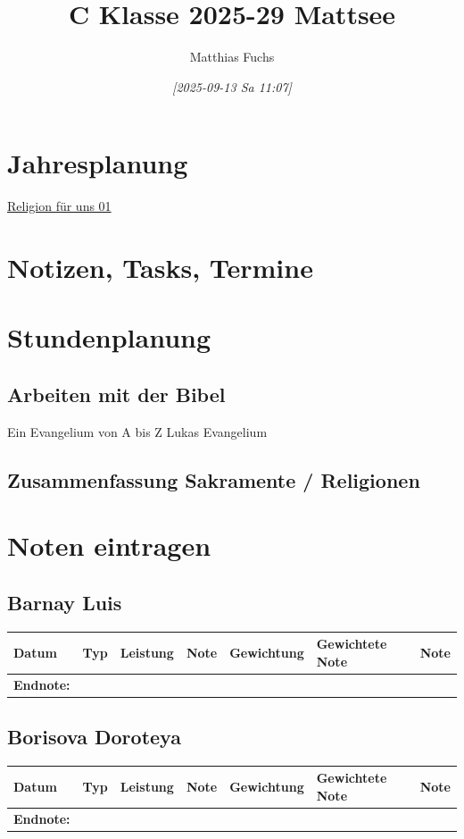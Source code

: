 \documentclass[11pt]{article}
\author{Matthias Fuchs}
\date{\textit{{[}2025-09-13 Sa 11:07]}}
\title{C Klasse 2025-29 Mattsee}
\begin{document}
\maketitle
\tableofcontents

\section{Jahresplanung}
\label{sec:orgd0d6fd6}

\href{/home/matthias/Documents/notes/20250913T113018--religion-für-uns-01\_\_project\_topic01.org}{Religion für uns 01}
\section{Notizen, Tasks, Termine}
\label{sec:orgbe9558c}


\section{Stundenplanung}
\label{sec:org8c852da}

\subsection{Arbeiten mit der Bibel}
\label{sec:org263f7cb}

Ein Evangelium von A bis Z
Lukas Evangelium
\subsection{Zusammenfassung Sakramente / Religionen}
\label{sec:orgdd80448}
\section{Noten eintragen}
\label{sec:org3b29bf7}

\subsection{Barnay Luis}
\label{sec:org83da576}
\begin{center}
\begin{tabular}{lllllll}
Datum & Typ & Leistung & Note & Gewichtung & Gewichtete Note & Note\\
\hline
\hline
\textbf{Endnote:} &  &  &  &  &  & \\
\end{tabular}
\end{center}
\subsection{Borisova Doroteya}
\label{sec:org8a2393f}
\begin{center}
\begin{tabular}{lllllll}
Datum & Typ & Leistung & Note & Gewichtung & Gewichtete Note & Note\\
\hline
\hline
\textbf{Endnote:} &  &  &  &  &  & \\
\end{tabular}
\end{center}
\end{document}
